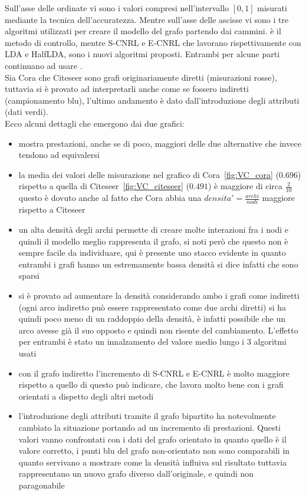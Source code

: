 %
Sull'asse delle ordinate vi sono i valori compresi nell'intervallo $[0, 1]$ misurati mediante la tecnica dell'accuratezza. Mentre sull'asse delle ascisse vi sono i tre algoritmi utilizzati per creare il modello del grafo partendo dai cammini. \wv è il metodo di controllo, mentre S-CNRL e E-CNRL che lavorano rispettivamente con LDA e HalfLDA, sono i nuovi algoritmi proposti. Entrambi per alcune parti continuano ad usare \wv.\\
Sia Cora che Citeseer sono grafi originariamente diretti (misurazioni rosse), tuttavia si è provato ad interpretarli anche come se fossero indiretti (campionamento blu), l'ultimo andamento è dato dall'introduzione degli attributi (dati verdi).\\
Ecco alcuni dettagli che emergono dai due grafici:
\begin{itemize}
	\item \wv mostra prestazioni, anche se di poco, maggiori delle due alternative che invece tendono ad equivalersi
	\item la media dei valori delle misurazione nel grafico di Cora~\ref{fig:VC_cora} ($0.696$) rispetto a quella di Citeseer~\ref{fig:VC_citeseer} ($0.491$) è maggiore di circa $\displaystyle \frac{2}{10}$ questo è dovuto anche al fatto che Cora abbia una $\displaystyle densita' = \frac{archi}{nodi}$ maggiore rispetto a Citeseer
	\item un alta densità degli archi permette di creare molte interazioni fra i nodi e quindi il modello meglio rappresenta il grafo, si noti però che questo non è sempre facile da individuare, qui è presente uno stacco evidente in quanto entrambi i grafi hanno un estremamente bassa densità si dice infatti che sono sparsi
	\item si è provato ad aumentare la densità considerando ambo i grafi come indiretti (ogni arco indiretto può essere rappresentato come due archi diretti) si ha quindi poco meno di un raddoppio della densità, è infatti possibile che un arco avesse già il suo opposto e quindi non risente del cambiamento.
	L'effetto per entrambi è stato un innalzamento del valore medio lungo i 3 algoritmi usati
	\item con il grafo indiretto l'incremento di S-CNRL e E-CNRL è molto maggiore rispetto a quello di \wv questo può indicare, che \wv lavora molto bene con i grafi orientati a dispetto degli altri metodi
	\item l'introduzione degli attributi tramite il grafo bipartito ha notevolmente cambiato la situazione portando ad un incremento di prestazioni. Questi valori vanno confrontati con i dati del grafo orientato in quanto quello è il valore corretto, i punti blu del grafo non-orientato non sono comparabili in quanto servivano a mostrare come la densità influiva sul risultato tuttavia rappresentano un nuovo grafo diverso dall'originale, e quindi non paragonabile
\end{itemize}
%
